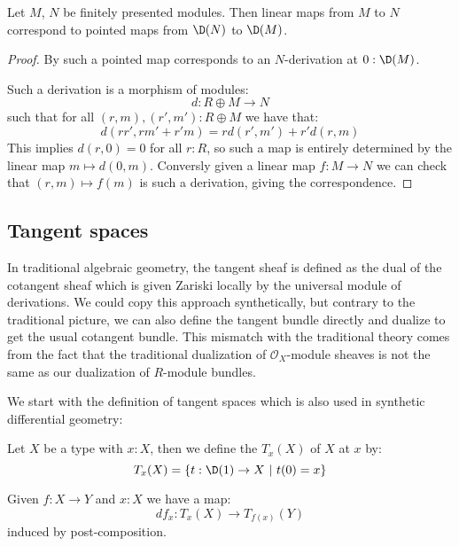 \begin{lemma}\label{equivalence-module-infinitesimal}
Let $M$, $N$ be finitely presented modules. Then linear maps from $M$ to $N$ correspond to
pointed maps from $\D(N)$ to $\D(M)$. 
\end{lemma}

\begin{proof}
By  such a pointed map corresponds to an $N$-derivation at $0:\D(M)$.

Such a derivation is a morphism of modules:
\[d:R\oplus M\to N\]
such that for all $(r,m),(r',m'):R\oplus M$ we have that:
\[d(rr',rm'+r'm) = rd(r',m')+r'd(r,m)\]
This implies $d(r,0) = 0$ for all $r : R$, so such a map is entirely determined by the linear map $m\mapsto d(0,m)$. Conversly given a linear map $f:M\to N$ we can check that $(r,m)\mapsto f(m)$ is such a derivation, giving the correspondence.
\end{proof}


\subsection{Tangent spaces}
  \label{remark-sym-dual}

In traditional algebraic geometry, the tangent sheaf is defined as the dual of the cotangent sheaf which is given Zariski locally by the universal module of derivations. We could copy this approach synthetically, but contrary to the traditional picture, we can also define the tangent bundle directly and dualize to get the usual cotangent bundle. This mismatch with the traditional theory comes from the fact that the traditional dualization of $\mathcal O_X$-module sheaves is not the same as our dualization of $R$-module bundles.

We start with the definition of tangent spaces which is also used in synthetic differential geometry:

\begin{definition}
Let $X$ be a type with $x:X$, then we define the  $T_x(X)$  of $X$ at $x$ by:
\[T_x(X) = \{t:\D(1)\to X\ |\ t(0)=x\}\]
\end{definition}

\begin{definition}
Given $f:X\to Y$ and $x:X$ we have a map:
\[df_x : T_x(X)\to T_{f(x)}(Y)\]
induced by post-composition.
\end{definition}

